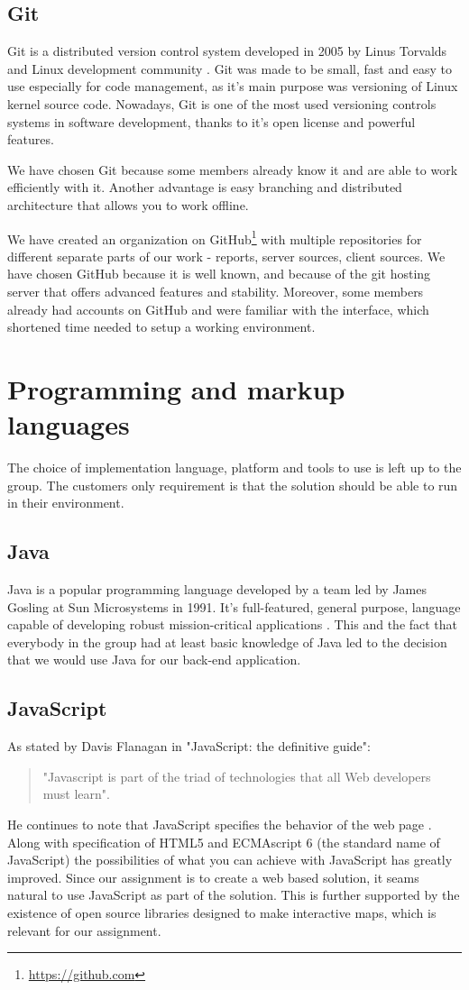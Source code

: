 \documentclass[11pt,a4paper,titlepage,oneside]{report}
\begin{document}
  \subsection{Git}
  Git is a distributed version control system developed in 2005 by Linus Torvalds and Linux development community \cite{ProGit}. Git was made to be small, fast and easy to use especially for code management, as it's main purpose was versioning of Linux kernel source code. Nowadays, Git is one of the most used versioning controls systems in software development, thanks to it's open license and powerful features.

  We have chosen Git because some members already know it and are able to work efficiently with it. Another advantage is easy branching and distributed architecture that allows you to work offline. 
  
  We have created an organization on GitHub\footnote{\url{https://github.com}} with multiple repositories for different separate parts of our work - reports, server sources, client sources. We have chosen GitHub because it is well known, and because of the git hosting server that offers advanced features and stability. Moreover, some members already had accounts on GitHub and were familiar with the interface, which shortened time needed to setup a working environment.

\section{Programming and markup languages}
The choice of implementation language, platform and tools to use is left up to the group. The customers only requirement is that the solution should be able to run in their environment.
  \subsection{Java}
  Java is a popular programming language developed by a team led by James Gosling at Sun Microsystems in 1991. It's full-featured, general purpose, language capable of developing robust mission-critical applications \cite{liang}. This and the fact that everybody in the group had at least basic knowledge of Java led to the decision that we would use Java for our \gls{back-end} application.  
  \subsection{JavaScript}
  As stated by Davis Flanagan in "JavaScript: the definitive guide": 
  \begin{quote}
  "Javascript is part of the triad of technologies that all Web developers must learn".
  \end{quote} 
  He continues to note that JavaScript specifies the behavior of the web page \cite{fd11}. Along with specification of \gls{HTML5} and ECMAscript 6 (the standard name of JavaScript) the possibilities of what you can achieve with JavaScript has greatly improved. Since our assignment is to create a web based solution, it seams natural to use JavaScript as part of the solution. This is further supported by the existence of \gls{open source} libraries designed to make interactive maps, which is relevant for our assignment.
\end{document}
